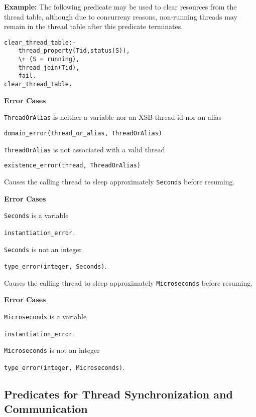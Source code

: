 \begin{description}
{\bf Example:} The following predicate may be used to clear resources
from the thread table, although due to concurreny reasons, non-running
threads may remain in the thread table after this predicate
terminates.
\begin{verbatim}
clear_thread_table:- 
    thread_property(Tid,status(S)),
    \+ (S = running),
    thread_join(Tid),
    fail.
clear_thread_table.
\end{verbatim}

{\bf Error Cases}
%
\bi
\item {\tt ThreadOrAlias} is neither a variable nor an XSB thread id
  nor an alias
\bi
\item {\tt domain\_error(thread\_or\_alias, ThreadOrAlias)}
\ei
\item {\tt ThreadOrAlias} is not associated with a valid thread
\bi
\item {\tt existence\_error(thread, ThreadOrAlias)}
\ei
\ei

%
Causes the calling thread to sleep approximately {\tt Seconds}
before resuming.

{\bf Error Cases}
\bi
\item 	{\tt Seconds} is a variable
\bi
\item 	{\tt instantiation\_error}.
\ei
\item 	{\tt Seconds} is not an integer
\bi
\item 	{\tt type\_error(integer, Seconds)}.
\ei
\ei


%
Causes the calling thread to sleep approximately {\tt Microseconds}
before resuming.

{\bf Error Cases}
\bi
\item 	{\tt Microseconds} is a variable
\bi
\item 	{\tt instantiation\_error}.
\ei
\item 	{\tt Microseconds} is not an integer
\bi
\item 	{\tt type\_error(integer, Microseconds)}.
\ei
\ei



% 

\end{description}

\subsection{Predicates for Thread Synchronization and Communication} 
\label{sec:synchronization}

